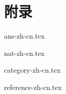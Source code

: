 \documentclass[zihao=5, b5paper, twoside, heading=true]{ctexbook}
\begin{document}
\part*{附录}
\appendix
\noappendicestocpagenum
\addappheadtotoc

\backmatter
{ans-zh-cn.tex}

{nat-zh-cn.tex}

{category-zh-cn.tex}

{reference-zh-cn.tex}

\printindex

%
\end{document}
